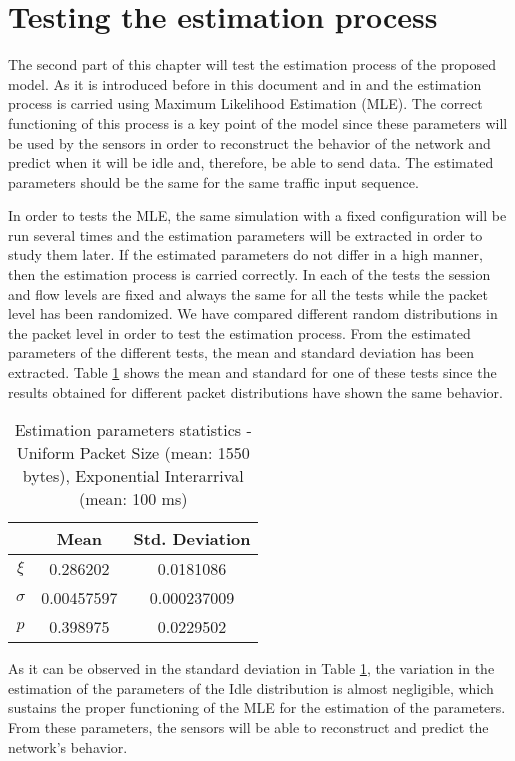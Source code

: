 \section{Testing the estimation process} \label{sec:MLE2}
The second part of this chapter will test the estimation process of the proposed model. As it is introduced before in this document and in \cite{ioannis} and \cite{marcello} the estimation process is carried using Maximum Likelihood Estimation (\acs{MLE}). The correct functioning of this process is a key point of the model since these parameters will be used by the sensors in order to reconstruct the behavior of the network and predict when it will be idle and, therefore, be able to send data. The estimated parameters should be the same for the same traffic input sequence. 

In order to tests the \acs{MLE}, the same simulation with a fixed configuration will be run several times and the estimation parameters will be extracted in order to study them later. If the estimated parameters do not differ in a high manner, then the estimation process is carried correctly. In each of the tests the session and flow levels are fixed and always the same for all the tests while the packet level has been randomized. We have compared different random distributions in the packet level in order to test the estimation process. From the estimated parameters of the different tests, the mean and standard deviation has been extracted. Table \ref{table:MLE} shows the mean and standard for one of these tests since the results obtained for different packet distributions have shown the same behavior.


\begin{table}[h]
	\centering
	\begin{tabular}{ c | c | c }
		& Mean & Std. Deviation \\ \hline
		$\xi$ & 0.286202 & 0.0181086 \\ 
		$\sigma$ & 0.00457597 & 0.000237009 \\
		$p$ & 0.398975 & 0.0229502 \\
	\end{tabular}
	\caption{Estimation parameters statistics - Uniform Packet Size (mean: 1550 bytes), Exponential Interarrival (mean: 100 ms)}
	\label{table:MLE}
\end{table}

As it can be observed in the standard deviation in Table \ref{table:MLE}, the variation in the estimation of the parameters of the Idle distribution is almost negligible, which sustains the proper functioning of the \acs{MLE} for the estimation of the parameters. From these parameters, the sensors will be able to reconstruct and predict the network's behavior.
